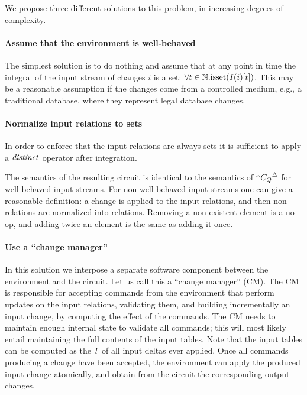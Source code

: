 We propose three different solutions to this problem, in increasing degrees of complexity.

\paragraph{Assume that the environment is well-behaved}

The simplest solution is to do nothing and assume that at any point in time 
the integral of the input stream of changes $i$ is a set: $\forall t \in \mathbb{N} . \mbox{isset}(\mathit{I}(i)[t])$.
This may be a reasonable assumption if the changes come from a controlled
medium, e.g., a traditional database, where they represent legal database changes.

\paragraph{Normalize input relations to sets}

In order to enforce that the input relations are always sets it is sufficient
to apply a $\mathit{distinct}$ operator after integration.  


The semantics of the resulting circuit is identical to the semantics of ${{\uparrow}C_Q}^{\Delta}$
for well-behaved input streams.  For non-well behaved input streams one can give
a reasonable definition: a change is applied to the input relations, and then non-relations
are normalized into relations.  Removing a non-existent element is a no-op, and adding twice
an element is the same as adding it once.

\paragraph{Use a ``change manager''}

In this solution we interpose a separate software component between the environment
and the circuit.  Let us call this a ``change manager'' (CM).  The CM
is responsible for accepting commands from the environment that perform updates on the input
relations, validating them, and building incrementally an input change, by computing the
effect of the commands.  The CM needs to maintain enough internal state to validate all commands; this 
will most likely entail maintaining the full contents of the input tables.  Note that
the input tables can be computed as the $\mathit{I}$ of all input deltas ever applied.  Once all 
commands producing a change have been accepted, the environment can apply the produced input change
atomically, and obtain from the circuit the corresponding output changes.

